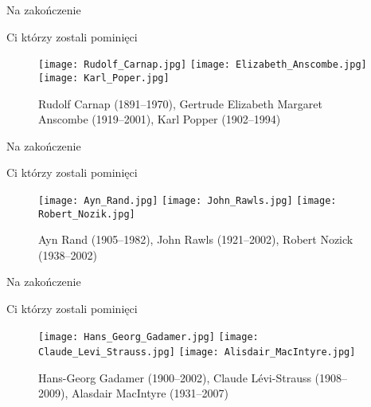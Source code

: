 \documentclass{beamer}  %
\begin{document}
\begin{frame}{Na zakończenie}
  \begin{block}{Ci którzy zostali pominięci}
    \begin{figure}
      \centering

      \texttt{[image: Rudolf\_Carnap.jpg]}
      \texttt{[image: Elizabeth\_Anscombe.jpg]}
      \texttt{[image: Karl\_Poper.jpg]}
      \caption{Rudolf Carnap (1891--1970), Gertrude Elizabeth Margaret
        Anscombe (1919--2001), Karl Popper (1902--1994)}
    \end{figure}
  \end{block}

\end{frame}



\begin{frame}{Na zakończenie}

  \begin{block}{Ci którzy zostali pominięci}
    \begin{figure}
      \centering

      \texttt{[image: Ayn\_Rand.jpg]}
      \texttt{[image: John\_Rawls.jpg]}
      \texttt{[image: Robert\_Nozik.jpg]}
      \caption{Ayn Rand (1905--1982), John Rawls (1921--2002), Robert
        Nozick (1938--2002)}
    \end{figure}
  \end{block}

\end{frame}



\begin{frame}{Na zakończenie}
  \begin{block}{Ci którzy zostali pominięci}
    \begin{figure}
      \centering

      \texttt{[image: Hans\_Georg\_Gadamer.jpg]}
      \texttt{[image: Claude\_Levi\_Strauss.jpg]}
      \texttt{[image: Alisdair\_MacIntyre.jpg]}
      \caption{Hans-Georg Gadamer (1900--2002), Claude Lévi-Strauss
        (1908--2009), Alasdair MacIntyre (1931--2007)}
    \end{figure}
  \end{block}
\end{frame}
\end{document}
